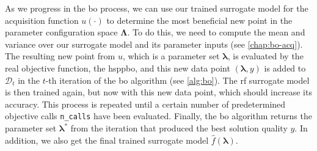 As we progress in the \gls{bo} process, we can use our trained surrogate model for the acquisition function $u(\cdot)$ to determine the most beneficial new point in the parameter configuration space $\mathbf{\Lambda}$. To do this, we need to compute the mean and variance over our surrogate model and its parameter inputs (see \cref{chap:bo-acq}). The resulting new point from $u$, which is a parameter set $\mathbf{\lambda}$, is evaluated by the real objective function, the \gls{hsppbo}, and this new data point $(\mathbf{\lambda}, y)$ is added to $\mathcal{D}_t$ in the $t$-th iteration of the \gls{bo} algorithm (see \cref{alg:bo}). The \gls{rf} surrogate model is then trained again, but now with this new data point, which should increase its accuracy. This process is repeated until a certain number of predetermined objective calls \texttt{n\_calls} have been evaluated. Finally, the \gls{bo} algorithm returns the parameter set $\mathbf{\lambda}^*$ from the iteration that produced the best solution quality $y$. In addition, we also get the final trained surrogate model $\hat{f}(\mathbf{\lambda})$.